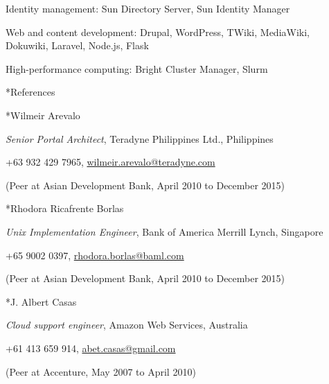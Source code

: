 \documentclass[10pt, a4paper, final]{article}
\begin{document}
\begin{section}
\begin{subsection}
\begin{compactitem}
      \item Identity management: Sun Directory Server, Sun Identity Manager
      \item Web and content development: Drupal, WordPress, TWiki, MediaWiki, Dokuwiki, Laravel, Node.js, Flask
      \item High-performance computing: Bright Cluster Manager, Slurm
    \end{compactitem}
  \end{subsection}
\end{section}

\vspace{2em}

\begin{section}*{References}
  \begin{subsection}*{Wilmeir Arevalo}
    \begin{compactitem}
      \item[] \textit{Senior Portal Architect}, Teradyne Philippines Ltd., Philippines
      \item[] +63 932 429 7965, \href{mailto:wilmeir.arevalo@teradyne.com}{wilmeir.arevalo@teradyne.com}
      \item[] (Peer at Asian Development Bank, April 2010 to December 2015)
    \end{compactitem}
  \end{subsection}

  \begin{subsection}*{Rhodora Ricafrente Borlas}
    \begin{compactitem}
      \item[] \textit{Unix Implementation Engineer}, Bank of America Merrill Lynch, Singapore
      \item[] +65 9002 0397, \href{mailto:rhodora.borlas@baml.com}{rhodora.borlas@baml.com}
      \item[] (Peer at Asian Development Bank, April 2010 to December 2015)
    \end{compactitem}
  \end{subsection}

  \begin{subsection}*{J. Albert Casas}
    \begin{compactitem}
      \item[] \textit{Cloud support engineer}, Amazon Web Services, Australia
      \item[] +61 413 659 914, \href{mailto:abet.casas@gmail.com}{abet.casas@gmail.com}
      \item[] (Peer at Accenture, May 2007 to April 2010)
    \end{compactitem}
  \end{subsection}


\end{section}
\end{document}
